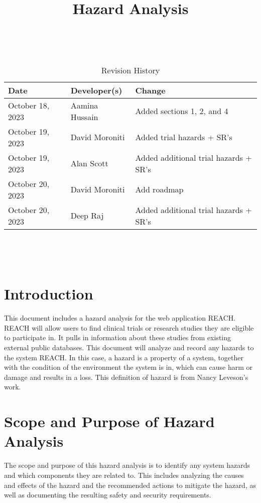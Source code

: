 \documentclass{article}
\title{Hazard Analysis\\\progname}
\author{\authname}
\date{}
\begin{document}
\maketitle
\thispagestyle{empty}

~\newpage


\begin{table}[hp]
\caption{Revision History} \label{TblRevisionHistory}
\begin{tabularx}{\textwidth}{llX}
\toprule
\textbf{Date} & \textbf{Developer(s)} & \textbf{Change}\\
\midrule
October 18, 2023 & Aamina Hussain & Added sections 1, 2, and 4\\
October 19, 2023 & David Moroniti & Added trial hazards + SR's\\
October 19, 2023 & Alan Scott & Added additional trial hazards + SR's \\
October 20, 2023 & David Moroniti & Add roadmap\\
October 20, 2023 & Deep Raj & Added additional trial hazards + SR's \\
\bottomrule
\end{tabularx}
\end{table}

~\newpage

\tableofcontents

~\newpage


\section{Introduction}
This document includes a hazard analysis for the web application REACH. REACH will allow users 
to find clinical trials or research studies they are eligible to participate in. It pulls in information about these studies 
from existing external public databases. This document will analyze and record any hazards to the system REACH. In this case, 
a hazard is a property of a system, together with the condition of the environment the system is in, which can cause harm or 
damage and results in a loss. This definition of hazard is from Nancy Leveson's work.

\section{Scope and Purpose of Hazard Analysis}
The scope and purpose of this hazard analysis is to identify any system hazards and which components they are related to. This 
includes analyzing the causes and effects of the hazard and the recommended actions to mitigate the hazard, as well as documenting 
the resulting safety and security requirements.
\end{document}
